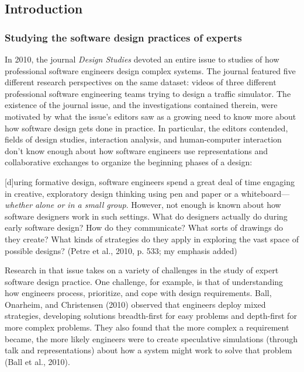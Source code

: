 \subsection{Introduction}\label{introduction-1}

\subsubsection{Studying the software design practices of
experts}\label{studying-the-software-design-practices-of-experts}

In 2010, the journal \emph{Design Studies} devoted an entire issue to
studies of how professional software engineers design complex systems.
The journal featured five different research perspectives on the same
dataset: videos of three different professional software engineering
teams trying to design a traffic simulator. The existence of the journal
issue, and the investigations contained therein, were motivated by what
the issue's editors saw as a growing need to know more about how
software design gets done in practice. In particular, the editors
contended, fields of design studies, interaction analysis, and
human-computer interaction don't know enough about how software
engineers use representations and collaborative exchanges to organize
the beginning phases of a design:

{[}d{]}uring formative design, software engineers spend a great deal of
time engaging in creative, exploratory design thinking using pen and
paper or a whiteboard---\emph{whether alone or in a small group}.
However, not enough is known about how software designers work in such
settings. What do designers actually do during early software design?
How do they communicate? What sorts of drawings do they create? What
kinds of strategies do they apply in exploring the vast space of
possible designs? (Petre et al., 2010, p. 533; my emphasis added)

Research in that issue takes on a variety of challenges in the study of
expert software design practice. One challenge, for example, is that of
understanding how engineers process, prioritize, and cope with design
requirements. Ball, Onarheim, and Christensen (2010) observed that
engineers deploy mixed strategies, developing solutions breadth-first
for easy problems and depth-first for more complex problems. They also
found that the more complex a requirement became, the more likely
engineers were to create speculative simulations (through talk and
representations) about how a system might work to solve that problem
(Ball et al., 2010).

